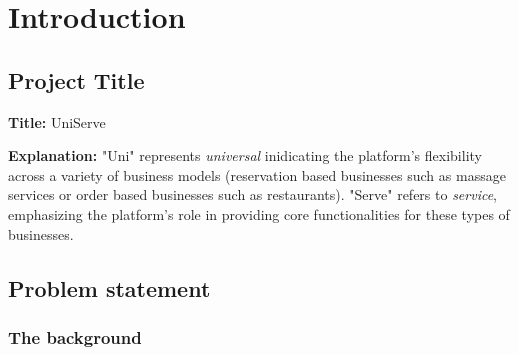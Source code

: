 \documentclass[]{VUMIFTemplateClass}
\begin{document}

\onehalfspacing


\singlespacing
{}


\tableofcontents
\onehalfspacing




\section{Introduction}
\subsection{Project Title}

\textbf{Title:} UniServe

\textbf{Explanation:} "Uni" represents \emph{universal} inidicating the platform's flexibility across a variety of business models 
(reservation based businesses such as massage services or order based businesses such as restaurants). 
"Serve" refers to \emph{service}, emphasizing the platform’s role in providing core functionalities for these types of businesses.

\subsection{Problem statement}

\subsubsection{The background}

\end{document}
